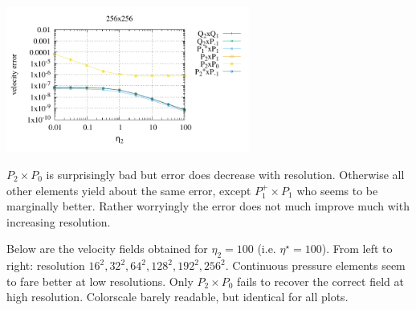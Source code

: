 \begin{center}
\includegraphics[width=8cm]{python_codes/fieldstone_120/paperresults/rt/structured/rt_wave_velerror_256.pdf}
\end{center}

$P_2\times P_0$ is surprisingly bad but error does decrease with resolution. 
Otherwise all other elements yield about the same error, except $P_1^+ \times P_1$
who seems to be marginally better.
Rather worryingly the error does not much improve much with increasing resolution.

\newpage
Below are the velocity fields obtained for $\eta_2=100$ (i.e. $\eta^\star=100$).
From left to right: resolution $16^2,32^2,64^2,128^2,192^2,256^2$.
Continuous pressure elements seem to fare better at low resolutions. Only 
$P_2\times P_0$ fails to recover the correct field at high resolution.
Colorscale barely readable, but identical for all plots.

